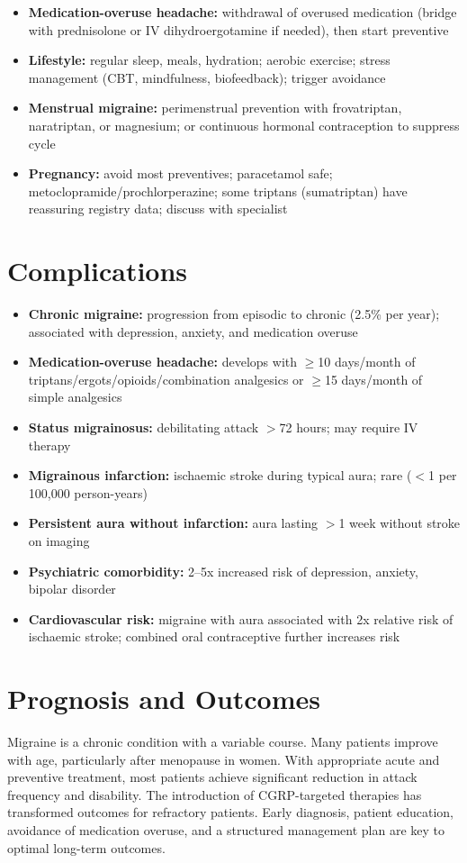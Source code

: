 \begin{itemize}
    \item \textbf{Medication-overuse headache:} withdrawal of overused medication (bridge with prednisolone or IV dihydroergotamine if needed), then start preventive
    \item \textbf{Lifestyle:} regular sleep, meals, hydration; aerobic exercise; stress management (CBT, mindfulness, biofeedback); trigger avoidance
    \item \textbf{Menstrual migraine:} perimenstrual prevention with frovatriptan, naratriptan, or magnesium; or continuous hormonal contraception to suppress cycle
    \item \textbf{Pregnancy:} avoid most preventives; paracetamol safe; metoclopramide/prochlorperazine; some triptans (sumatriptan) have reassuring registry data; discuss with specialist
\end{itemize}

\section*{Complications}
\begin{itemize}
    \item \textbf{Chronic migraine:} progression from episodic to chronic (2.5\% per year); associated with depression, anxiety, and medication overuse
    \item \textbf{Medication-overuse headache:} develops with $\ge$10 days/month of triptans/ergots/opioids/combination analgesics or $\ge$15 days/month of simple analgesics
    \item \textbf{Status migrainosus:} debilitating attack $>$72 hours; may require IV therapy
    \item \textbf{Migrainous infarction:} ischaemic stroke during typical aura; rare ($<$1 per 100,000 person-years)
    \item \textbf{Persistent aura without infarction:} aura lasting $>$1 week without stroke on imaging
    \item \textbf{Psychiatric comorbidity:} 2--5x increased risk of depression, anxiety, bipolar disorder
    \item \textbf{Cardiovascular risk:} migraine with aura associated with 2x relative risk of ischaemic stroke; combined oral contraceptive further increases risk
\end{itemize}

\section*{Prognosis and Outcomes}
Migraine is a chronic condition with a variable course. Many patients improve with age, particularly after menopause in women. With appropriate acute and preventive treatment, most patients achieve significant reduction in attack frequency and disability. The introduction of CGRP-targeted therapies has transformed outcomes for refractory patients. Early diagnosis, patient education, avoidance of medication overuse, and a structured management plan are key to optimal long-term outcomes.

